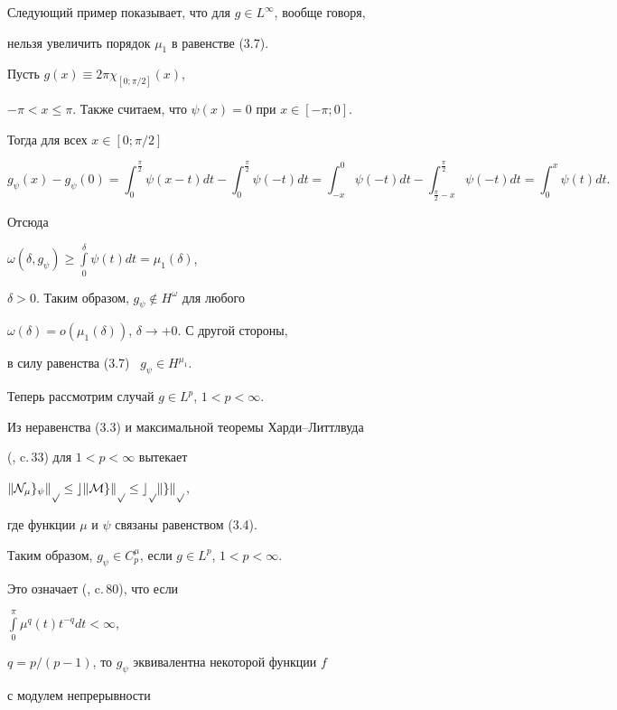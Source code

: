Следующий пример показывает, что для $g\in L^\infty$, вообще говоря,


нельзя увеличить порядок $\mu_1$ в равенстве (3.7).





\begin{exam}


Пусть $g(x)\equiv 2\pi\chi_{[0;\pi/2]}(x)$,


$-\pi<x\le\pi$. Также считаем, что $\psi(x)=0$ при $x\in[-\pi;0]$.


Тогда для всех $x\in[0;\pi/2]$


$$


g_\psi(x)-g_\psi(0)=\int_0^{\frac{\pi}{2}}\psi(x-t)dt-


\int_0^{\frac{\pi}{2}}\psi(-t)dt= 


\int_{-x}^0\psi(-t)dt-\int_{\frac{\pi}{2}-x}


^{\frac{\pi}{2}}\psi(-t)dt=\int_0^x\psi(t)dt.


$$


Отсюда


$\omega(\delta,g_\psi)\ge\int\limits_0^\delta\psi(t)dt=\mu_1(\delta)$,


$\delta>0$. Таким образом, $g_\psi\notin H^\omega$ для любого


$\omega(\delta)=o(\mu_1(\delta))$, $\delta\to+0$. С другой стороны,


в силу равенства (3.7) \ $g_\psi\in H^{\mu_1}$.


\end{exam}





Теперь рассмотрим случай $g\in L^p$, $1<p<\infty$.


Из неравенства (3.3) и максимальной теоремы Харди--Литтлвуда


(\cite{gar}, c.\,33) для $1<p<\infty$ вытекает


$\|\cal N_\mu g_\psi\|_p\le c\|Mg\|_p\le c_p\|g\|_p$,


где функции $\mu$ и $\psi$ связаны равенством (3.4).


Таким образом, $g_\psi\in C_p^\mu$, если $g\in L^p$, $1<p<\infty$.


Это означает (\cite{kor}, c.\,80), что если


$\int\limits_0^\pi\mu^q(t)t^{-q}dt<\infty$,


$q=p/(p-1)$, то $g_\psi$ эквивалентна некоторой функции $f$


с модулем непрерывности


